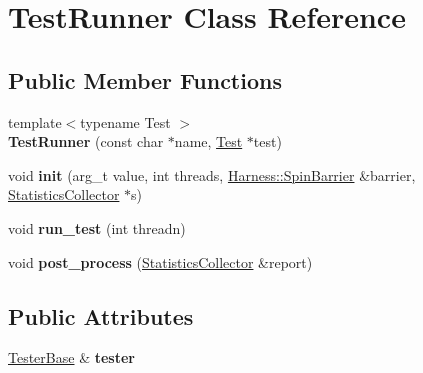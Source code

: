 \hypertarget{classTestRunner}{}\section{Test\+Runner Class Reference}
\label{classTestRunner}
\subsection*{Public Member Functions}
\begin{DoxyCompactItemize}
\item 
\hypertarget{classTestRunner_a6b15d8e2bbbc3818b423d2afe39392fd}{}{\footnotesize template$<$typename Test $>$ }\\{\bfseries Test\+Runner} (const char $\ast$name, \hyperlink{classTest}{Test} $\ast$test)\label{classTestRunner_a6b15d8e2bbbc3818b423d2afe39392fd}

\item 
\hypertarget{classTestRunner_a00651f75d9e7f2a0ee16021ababc7be8}{}void {\bfseries init} (arg\+\_\+t value, int threads, \hyperlink{classHarness_1_1SpinBarrier}{Harness\+::\+Spin\+Barrier} \&barrier, \hyperlink{classStatisticsCollector}{Statistics\+Collector} $\ast$s)\label{classTestRunner_a00651f75d9e7f2a0ee16021ababc7be8}

\item 
\hypertarget{classTestRunner_a1e2c37a1f33af10cf0adc09403a0e10e}{}void {\bfseries run\+\_\+test} (int threadn)\label{classTestRunner_a1e2c37a1f33af10cf0adc09403a0e10e}

\item 
\hypertarget{classTestRunner_a137ea427e441d2bd45af0c911c771e27}{}void {\bfseries post\+\_\+process} (\hyperlink{classStatisticsCollector}{Statistics\+Collector} \&report)\label{classTestRunner_a137ea427e441d2bd45af0c911c771e27}

\end{DoxyCompactItemize}
\subsection*{Public Attributes}
\begin{DoxyCompactItemize}
\item 
\hypertarget{classTestRunner_a3601e563665e5f374173dad5802c8eb9}{}\hyperlink{classTesterBase}{Tester\+Base} \& {\bfseries tester}\label{classTestRunner_a3601e563665e5f374173dad5802c8eb9}

\end{DoxyCompactItemize}
